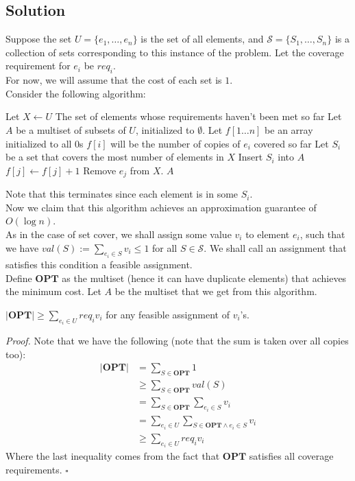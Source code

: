 \documentclass[a4paper]{article}
\newenvironment{proof}{\begin{breakbox}\textit{Proof.}}{\hfill$\square$\end{breakbox}}
\newcommand{\nl}{\vspace{0.2cm}\\}
\newcommand{\OPT}{\mathbf{OPT}}
\begin{document}
\subsection{Solution}
Suppose the set $U = \{e_1, \ldots, e_n\}$ is the set of all elements, and $\mathcal{S} = \{S_1, \ldots, S_n\}$ is a collection of sets corresponding to this instance of the problem. Let the
coverage requirement for $e_i$ be $req_i$.\nl
For now, we will assume that the cost of each set is $1$.\nl
Consider the following algorithm:
\begin{algorithmic}[1]
        \State Let $X \gets U$ \Comment The set of elements whose requirements haven't been met so far
        \State Let $A$ be a multiset of subsets of $U$, initialized to $\emptyset$.
        \State Let $f[1\ldots n]$ be an array initialized to all 0s
        \Comment $f[i]$ will be the number of copies of $e_i$ covered so far
            \State Let $S_i$ be a set that covers the most number of elements in $X$
            \State Insert $S_i$ into $A$
                \State $f[j] \gets f[j] + 1$
                    \State Remove $e_j$ from $X$.
                \EndIf
            \EndFor
        \EndWhile
        \State \Return $A$
    \EndFunction
\end{algorithmic}
Note that this terminates since each element is in some $S_i$.\nl
Now we claim that this algorithm achieves an approximation guarantee of $O(\log n)$.\nl
As in the case of set cover, we shall assign some value $v_i$ to element $e_i$, such that we have $val(S) := \sum_{e_i \in S} v_i \le 1$ for all $S \in \mathcal{S}$. We shall call an assignment
that satisfies this condition a feasible assignment.\nl
Define $\OPT$ as the multiset (hence it can have duplicate elements) that achieves the minimum cost. Let $A$ be the multiset that we get from this algorithm.\nl
\begin{claim}
    $|\OPT| \ge \sum_{e_i \in U} req_i v_i$ for any feasible assignment of $v_i$'s.
\end{claim}
\begin{proof}
    Note that we have the following (note that the sum is taken over all copies too):
    \begin{align*}
        |\OPT| &= \sum_{S \in \OPT} 1\\
               &\ge \sum_{S \in \OPT} val(S)\\
               &= \sum_{S \in \OPT} \sum_{e_i \in S} v_i\\
               &= \sum_{e_i \in U} \sum_{S\in \OPT \land e_i \in S} v_i\\
               &\ge \sum_{e_i \in U} req_i v_i
    \end{align*}
    Where the last inequality comes from the fact that $\OPT$ satisfies all coverage requirements.
\end{proof}
\end{document}
